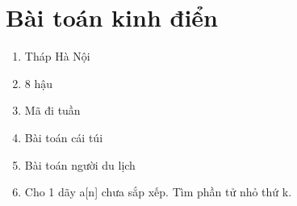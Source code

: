 \documentclass[12pt,a4paper]{article}
\begin{document}
\section{Bài toán kinh điển}
\begin{enumerate}
	\item Tháp Hà Nội
	\item 8 hậu
	\item Mã đi tuần
	\item Bài toán cái túi
	\item Bài toán người du lịch
	\item Cho 1 dãy a[n] chưa sắp xếp. Tìm phần tử nhỏ thứ k.
\end{enumerate}
\end{document}
